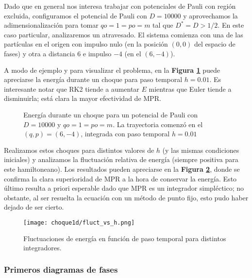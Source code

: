 Dado que en general nos interesa trabajar con potenciales de Pauli con región excluida, configuramos el potencial de Pauli con $D = 10000$ y aprovechamos la adimensionalización para tomar $qo = 1 = po = m$ tal que $D^*=D>1/2$.
En este caso particular, analizaremos un atravesado.
El sistema comienza con una de las partículas en el origen con impulso nulo (en la posición $(0, 0)$ del espacio de fases) y otra a distancia $6$ e impulso $-4$ (en el $(6, -4)$).

A modo de ejemplo y para visualizar el problema, en la \textbf{Figura \ref{fig:energ_choq}} puede apreciarse la energía durante un choque para paso temporal $h=0.01$.
Es interesante notar que RK2 tiende a aumentar $E$ mientras que Euler tiende a disminuirla; está clara la mayor efectividad de MPR.

\begin{figure}[h]
	\centering
	\caption{Energía durante un choque para un potencial de Pauli con $D = 10000$ y $qo = 1 = po = m$. La trayectoria comenzó en el $(q, p) = (6, -4)$, integrada con paso temporal $h=0.01$}
	\label{fig:energ_choq}
\end{figure}

Realizamos estos choques para distintos valores de $h$ (y las mismas condiciones iniciales) y analizamos la fluctuación relativa de energía (siempre positiva para este hamiltoneano).
Los resultados pueden apreciarse en la \textbf{Figura \ref{fig:flucvsh}}, donde se confirma la clara superioridad de MPR a la hora de conservar la energía.
Esto último resulta a priori esperable dado que MPR es un integrador simpléctico; no obstante, al ser resuelta la ecuación con un método de punto fijo, esto pudo haber dejado de ser cierto.

\begin{figure}[h]
	\centering
	\texttt{[image: choque1d/fluct\_vs\_h.png]}
	\caption{Fluctuaciones de energía en función de paso temporal para distintos integradores.}
	\label{fig:flucvsh}
\end{figure}

\subsubsection{Primeros diagramas de fases}

